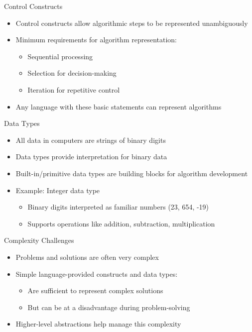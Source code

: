 \documentclass{beamer}
\begin{document}
\begin{frame}{Control Constructs}
    \begin{itemize}
        \item Control constructs allow algorithmic steps to be represented unambiguously
        \item Minimum requirements for algorithm representation:
        \begin{itemize}
            \item Sequential processing
            \item Selection for decision-making
            \item Iteration for repetitive control
        \end{itemize}
        \item Any language with these basic statements can represent algorithms
    \end{itemize}
\end{frame}

\begin{frame}{Data Types}
    \begin{itemize}
        \item All data in computers are strings of binary digits
        \item Data types provide interpretation for binary data
        \item Built-in/primitive data types are building blocks for algorithm development
        \item Example: Integer data type
        \begin{itemize}
            \item Binary digits interpreted as familiar numbers (23, 654, -19)
            \item Supports operations like addition, subtraction, multiplication
        \end{itemize}
    \end{itemize}
\end{frame}

\begin{frame}{Complexity Challenges}
    \begin{itemize}
        \item Problems and solutions are often very complex
        \item Simple language-provided constructs and data types:
        \begin{itemize}
            \item Are sufficient to represent complex solutions
            \item But can be at a disadvantage during problem-solving
        \end{itemize}
        \item Higher-level abstractions help manage this complexity
    \end{itemize}
\end{frame}
\end{document}
